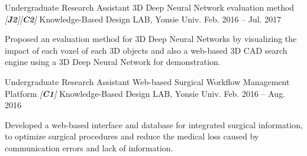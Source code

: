 \begin{cventries}
\cventry
{Undergraduate Research Assistant} %
{3D Deep Neural Network evaluation method \textit{[\textbf{J2}][\textbf{C2}]}} %
{Knowledge-Based Design LAB, Yonsie Univ.} %
{Feb. 2016 – Jul. 2017} %
{ %
\begin{cvitems}
\item {Proposed an evaluation method for 3D Deep Neural Networks by visualizing the impact of each voxel of each 3D objects and also a web-based 3D CAD search engine using a 3D Deep Neural Network for demonstration. }
\end{cvitems}
}

\cventry
{Undergraduate Research Assistant} %
{Web-based Surgical Workflow Management Platform \textit{[\textbf{C1}]}} %
{Knowledge-Based Design LAB, Yonsie Univ.} %
{Feb. 2016 – Aug. 2016} %
{ %
\begin{cvitems}
\item {Developed a web-based interface and database for integrated surgical information, to optimize surgical procedures and reduce the medical loss caused by communication errors and lack of information. }
\end{cvitems}
}

\end{cventries}